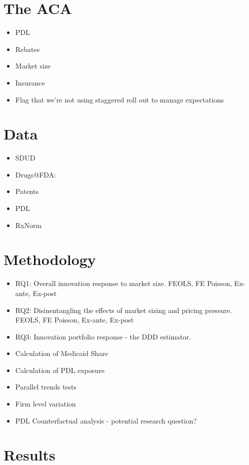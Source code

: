 \documentclass[12pt]{article}
\begin{document}
\section{The ACA}

\begin{itemize}
    \item PDL
    \item Rebates
    \item Market size
    \item Insurance
    \item Flag that we're not using staggered roll out to manage expectations
\end{itemize}


\section{Data}

\begin{itemize}
    \item SDUD
    \item Drugs@FDA: 
    \item Patents
    \item PDL
    \item RxNorm
\end{itemize}

\section{Methodology}

\begin{itemize}
    \item RQ1: Overall innovation response to market size. FEOLS, FE Poisson, Ex-ante, Ex-post
    \item RQ2: Disinentangling the effects of market sizing and pricing pressure. FEOLS, FE Poisson, Ex-ante, Ex-post
    \item RQ3: Innovation portfolio response - the DDD estimator.
    \item Calculation of Medicaid Share
    \item Calculation of PDL exposure
    \item Parallel trends tests
    \item Firm level variation
    \item PDL Counterfactual analysis - potential research question?
\end{itemize}

\section{Results}
\end{document}
